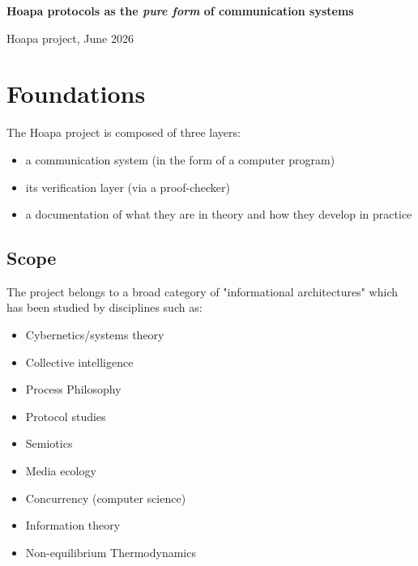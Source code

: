\documentclass[11pt]{article}
\begin{document}
\begin{center}
{\LARGE\bfseries Hoapa protocols as the \emph{pure form} of communication systems\par}
\vspace{0.65em}
{\large Hoapa project, June 2026\par}
\end{center}
\vspace{0.75em}
\tableofcontents
\newpage

\section{Foundations}

The Hoapa project is composed of three layers:

\begin{itemize}

\item a communication system (in the form of a computer program)

\item its verification layer (via a proof-checker)

\item a documentation of what they are in theory and how they develop in practice

\end{itemize}

\subsection{Scope}

The project belongs to a broad category of "informational architectures" which has been studied by disciplines such as:

\begin{itemize}

\item Cybernetics/systems theory

\item Collective intelligence

\item Process Philosophy

\item Protocol studies

\item Semiotics

\item Media ecology

\item Concurrency (computer science)

\item Information theory

\item Non-equilibrium Thermodynamics

\end{itemize}
\end{document}
